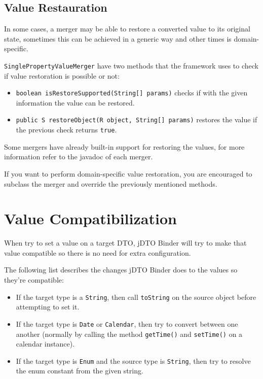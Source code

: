 \documentclass[11pt]{article}
\newcommand{\JDTO}{jDTO Binder\xspace}
\begin{document}
\subsection{Value Restauration}

In some cases, a merger may be able to restore a converted value to its original state, sometimes this can be achieved in a generic way and other times is domain-specific.

\texttt{SinglePropertyValueMerger} have two methods that the framework uses to check if value restoration is possible or not:

\begin{itemize}

\item \texttt{boolean isRestoreSupported(String[] params)} checks if with the given information the value can be restored.
\item \texttt{public S restoreObject(R object, String[] params)} restores the value if the previous check returns \texttt{true}.

\end{itemize}

Some mergers have already built-in support for restoring the values, for more information refer to the javadoc of each merger.

If you want to perform domain-specific value restoration, you are encouraged to subclass the merger and override the previously mentioned methods.

\clearpage

\section{Value Compatibilization}

When try to set a value on a target DTO, \JDTO will try to make that value compatible so there is no need for extra configuration.

The following list describes the changes \JDTO does to the values so they're compatible:

\begin{itemize}
\item If the target type is a \texttt{String}, then call \texttt{toString} on the source object before attempting to set it.
\item If the target type is \texttt{Date} or \texttt{Calendar}, then try to convert between one another (normally by calling the method \texttt{getTime()} and \texttt{setTime()} on a calendar instance). 
\item If the target type is \texttt{Enum} and the source type is \texttt{String}, then try to resolve the enum constant from the given string. 
\end{itemize}
\end{document}

